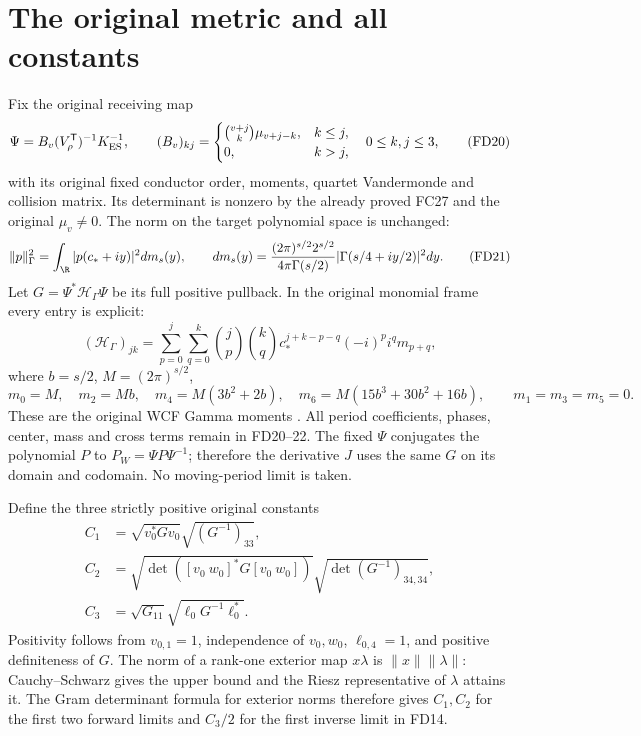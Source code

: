 \documentclass[11pt]{article}
\begin{document}
\section{The original metric and all constants}
Fix the original receiving map
\[
 \Psi=B_v(V_\rho^{\mathsf T})^{-1}K_{\rm ES}^{-1},\qquad
 (B_v)_{kj}=\begin{cases}
 \binom{v+j}{k}\mu_{v+j-k},&k\le j,\\0,&k>j,
 \end{cases}\quad 0\le k,j\le3,
 \tag{FD20}
\]
with its original fixed conductor order, moments,
quartet Vandermonde and collision matrix. Its determinant
is nonzero by the already proved FC27 and the original
\(\mu_v\ne0\). The norm on the target polynomial space
is unchanged:
\[
 \|p\|_\Gamma^2=\int_\R|p(c_*+iy)|^2dm_s(y),\qquad
 dm_s(y)=\frac{(2\pi)^{s/2}2^{s/2}}{4\pi\Gamma(s/2)}
                |\Gamma(s/4+iy/2)|^2dy .
 \tag{FD21}
\]
Let \(G=\Psi^*\mathcal H_\Gamma\Psi\) be its full positive
pullback. In the original monomial frame every entry is
explicit:
\[
 (\mathcal H_\Gamma)_{jk}
 =\sum_{p=0}^j\sum_{q=0}^k
 \binom jp\binom kq c_*^{j+k-p-q}(-i)^pi^q m_{p+q},
 \tag{FD22}
\]
where \(b=s/2\), \(M=(2\pi)^{s/2}\),
\[
 m_0=M,\quad m_2=Mb,\quad m_4=M(3b^2+2b),\quad
 m_6=M(15b^3+30b^2+16b),\qquad m_1=m_3=m_5=0.
\]
These are the original WCF Gamma moments \cite{WCF}.
All period coefficients, phases, center, mass and cross
terms remain in FD20--22. The fixed \(\Psi\) conjugates
the polynomial \(P\) to \(P_W=\Psi P\Psi^{-1}\); therefore
the derivative \(J\) uses the same \(G\) on its domain
and codomain. No moving-period limit is taken.

Define the three strictly positive original constants
\[
\begin{aligned}
 C_1&=\sqrt{v_0^*Gv_0}\sqrt{(G^{-1})_{33}},\\
 C_2&=\sqrt{\det([v_0\ w_0]^*G[v_0\ w_0])}
                       \sqrt{\det(G^{-1})_{34,34}},\\
 C_3&=\sqrt{G_{11}}\sqrt{\ell_0G^{-1}\ell_0^*}.
\end{aligned}\tag{FD23}
\]
Positivity follows from \(v_{0,1}=1\), independence
of \(v_0,w_0\), \(\ell_{0,4}=1\), and positive definiteness
of \(G\). The norm of a rank-one exterior map
\(x\lambda\) is \(\|x\|\|\lambda\|\): Cauchy--Schwarz
gives the upper bound and the Riesz representative of
\(\lambda\) attains it. The Gram determinant formula
for exterior norms therefore gives \(C_1,C_2\) for the
first two forward limits and \(C_3/2\) for the first
inverse limit in FD14.
\end{document}
